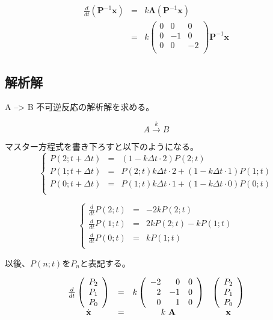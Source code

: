 \begin{eqnarray*}
\frac{d}{dt}({\mathbf P}^{-1}{\mathbf x}) & = & k{\mathbf \Lambda}({\mathbf P}^{-1}{\mathbf x})\\
& = & 
k
\left(
\begin{array}{rrr}
0 & 0 & 0 \\
0 & -1 & 0 \\
0 & 0 & -2 \\
\end{array}
\right)
{\mathbf P}^{-1}{\mathbf x}
\end{eqnarray*}

\subsection{解析解}
A --> B 不可逆反応の解析解を求める。

\[A \overset{k}\rightarrow B\]

マスター方程式を書き下ろすと以下のようになる。
\[
\left\{
\begin{array}{lcl}
P(2 ; t+\Delta t) & = & ( 1 - k \Delta t \cdot 2 ) P( 2 ; t )\\ 
P(1 ; t+\Delta t) & = & P( 2 ; t ) k \Delta t \cdot 2 + ( 1 - k \Delta t \cdot 1) P( 1 ; t )\\
P(0 ; t+\Delta t) & = & P( 1 ; t ) k \Delta t \cdot 1 + ( 1 - k \Delta t \cdot 0 ) P( 0 ; t)\\
\end{array}
\right.
\]

\[
\left\{
\begin{array}{lcl}
\frac{d}{dt} P( 2 ; t ) & = & -2k P( 2 ; t )\\ 
\frac{d}{dt} P( 1 ; t ) & = & 2k P( 2 ; t ) - k P( 1 ; t )\\
\frac{d}{dt} P( 0 ; t ) & = & k P( 1 ; t )\\
\end{array}
\right.
\]

以後、\(P(n;t)\)を\(P_n\)と表記する。

\[
\begin{array}{cccc}
\frac{d}{dt}
\left(
\begin{array}{l}
P_2\\
P_1\\
P_0\\
\end{array}
\right)
& = &
k
\left(
\begin{array}{rrr}
-2 & 0 & 0\\
2 & -1 & 0\\
0 & 1 & 0 \\
\end{array}
\right)
&
\left(
\begin{array}{l}
P_2\\
P_1\\
P_0\\
\end{array}
\right)\\
\dot{\bf x} & = & k \ {\bf A} & {\bf x}\\
\end{array}
\]

